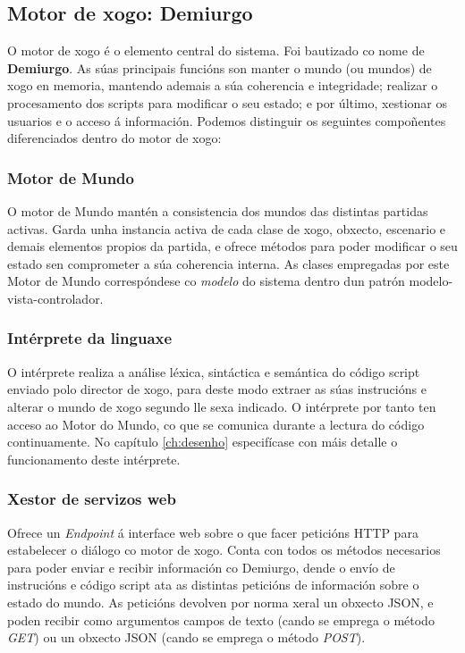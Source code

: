 \subsection{Motor de xogo: Demiurgo}
O motor de xogo é o elemento central do sistema. Foi bautizado co nome de
\textbf{Demiurgo}. As súas principais funcións son manter o mundo (ou mundos) de
xogo en memoria, mantendo ademais a súa coherencia e integridade; realizar o
procesamento dos scripts para modificar o seu estado; e por último, xestionar os
usuarios e o acceso á información. Podemos distinguir os seguintes compoñentes
diferenciados dentro do motor de xogo:

\subsubsection{Motor de Mundo}
O motor de Mundo mantén a consistencia dos mundos das distintas partidas
activas. Garda unha instancia activa de cada clase de xogo, obxecto, escenario e
demais elementos propios da partida, e ofrece métodos para poder modificar o seu
estado sen comprometer a súa coherencia interna. As clases empregadas por este
Motor de Mundo correspóndese co \textit{modelo} do sistema dentro dun patrón
modelo-vista-controlador.

\subsubsection{Intérprete da linguaxe}
O intérprete realiza a análise léxica, sintáctica e semántica do código
script enviado polo director de xogo, para deste modo extraer as súas
instrucións e alterar o mundo de xogo segundo lle sexa indicado. O intérprete
por tanto ten acceso ao Motor do Mundo, co que se comunica durante a lectura do
código continuamente. No capítulo \ref{ch:desenho} especifícase con máis detalle
o funcionamento deste intérprete.

\subsubsection{Xestor de servizos web}
Ofrece un \textit{Endpoint} á interface web sobre o que facer peticións HTTP
para estabelecer o diálogo co motor de xogo. Conta con todos os métodos
necesarios para poder enviar e recibir información co Demiurgo, dende o envío de
instrucións e código script ata as distintas peticións de información sobre o
estado do mundo. As peticións devolven por norma xeral un obxecto JSON, e poden
recibir como argumentos campos de texto (cando se emprega o método \textit{GET})
ou un obxecto JSON (cando se emprega o método \textit{POST}).

